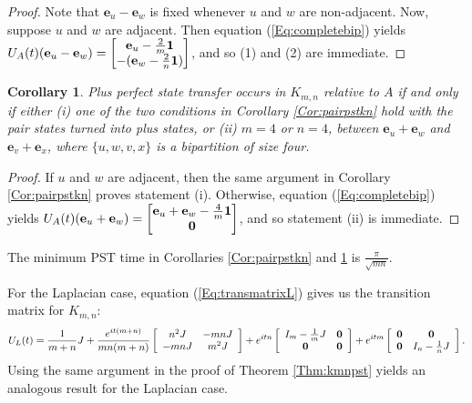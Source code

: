 \documentclass[11pt]{article}
\newtheorem{corollary}[theorem]{Corollary}
\newcommand{\zero}{{\bf{0}}}
\newcommand{\ones}{{\bf{1}}}
\newcommand{\be}{\mathbf e}
\begin{document}
\begin{proof}
Note that $\be_u-\be_w$ is fixed whenever $u$ and $w$ are non-adjacent. Now, suppose $u$ and $w$ are adjacent. Then equation (\ref{Eq:completebip}) yields $U_A(t)(\be_u-\be_w)=\begin{bmatrix}\be_u-\frac{2}{m} \ones\\ -(\be_w-\frac{2}{n}\ones)\end{bmatrix}$, and so (1) and (2) are immediate.
\end{proof}

\begin{corollary}
\label{Cor:pluspstkn}
Plus perfect state transfer occurs in $K_{m,n}$ relative to $A$ if and only if either (i) one of the two conditions in Corollary \ref{Cor:pairpstkn} hold with the pair states turned into plus states, or (ii) $m=4$ or $n=4$, between $\be_u+\be_w$ and $\be_v+\be_x$, where $\{u,w,v,x\}$ is a bipartition of size four.
\end{corollary}

\begin{proof}
If $u$ and $w$ are adjacent, then the same argument in Corollary \ref{Cor:pairpstkn} proves statement (i). Otherwise, equation (\ref{Eq:completebip}) yields $U_A(t)(\be_u+\be_w)=\begin{bmatrix}\be_u+\be_w-\frac{4}{m}\ones \\ \zero\end{bmatrix}$, and so statement (ii) is immediate.
\end{proof}

The minimum PST time in Corollaries \ref{Cor:pairpstkn} and \ref{Cor:pluspstkn} is $\frac{\pi}{\sqrt{mn}}$.

For the Laplacian case, equation (\ref{Eq:transmatrixL}) gives us the transition matrix for $K_{m,n}$:
$$U_{L}(t)=\frac{1}{m+n}J+\frac{e^{it(m+n)}}{mn(m+n)}\left[\begin{array}{cc} n^2J&-mnJ \\ -mnJ&m^2J\end{array} \right]+e^{itn}\left[\begin{array}{cc} I_m-\frac{1}{m}J&\zero \\ \zero&\zero\end{array} \right]+e^{itm}\left[\begin{array}{cc} \zero&\zero \\ \zero&I_n-\frac{1}{n}J\end{array} \right].$$
Using the same argument in the proof of Theorem \ref{Thm:kmnpst} yields an analogous result for the Laplacian case.
\end{document}
